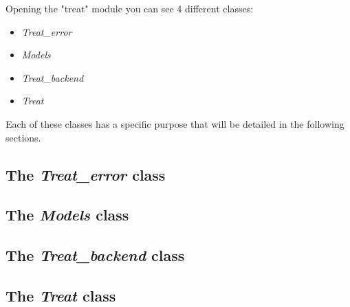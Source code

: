 Opening the "treat" module you can see 4 different classes:
\begin{itemize}
    \item \textit{Treat\_error}
    \item \textit{Models}
    \item \textit{Treat\_backend}
    \item \textit{Treat}
\end{itemize}

Each of these classes has a specific purpose that will be detailed in the following sections.

\subsection{The \textit{Treat\_error} class}
    

\subsection{The \textit{Models} class}
    

\subsection{The \textit{Treat\_backend} class}
    

\subsection{The \textit{Treat} class}
    